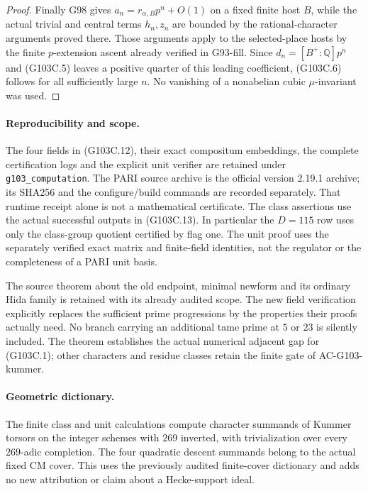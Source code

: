 \begin{proof}
Finally G98 gives $a_n=r_{\alpha,B}p^n+O(1)$ on a fixed finite
host $B$, while the actual trivial and central terms $h_n,z_n$
are bounded by the rational-character arguments proved there.
Those arguments apply to the selected-place hosts by the finite
$p$-extension ascent already verified in G93-fill.
Since $d_n=[B^+:\mathbb Q]p^n$ and (G103C.5) leaves a positive
quarter of this leading coefficient, (G103C.6) follows for all
sufficiently large $n$.
No vanishing of a nonabelian cubic $\mu$-invariant was used.
\end{proof}

\paragraph{Reproducibility and scope.}
The four fields in (G103C.12), their exact compositum embeddings,
the complete certification logs and the explicit unit verifier are
retained under \texttt{g103\_computation}.
The PARI source archive is the official version 2.19.1 archive;
its SHA256 and the configure/build commands are recorded separately.
That runtime receipt alone is not a mathematical certificate.
The class assertions use the actual successful outputs in
(G103C.13).  In particular the $D=115$ row uses only the
class-group quotient certified by flag one.
The unit proof uses the separately verified exact matrix and
finite-field identities, not the regulator or the completeness of
a PARI unit basis.

The source theorem about the old endpoint, minimal newform and its
ordinary Hida family is retained with its already audited scope.
The new field verification explicitly replaces the sufficient
prime progressions by the properties their proofs actually need.
No branch carrying an additional tame prime at $5$ or $23$ is
silently included.  The theorem establishes the actual numerical
adjacent gap for (G103C.1); other characters and residue classes
retain the finite gate of AC-G103-kummer.

\paragraph{Geometric dictionary.}
The finite class and unit calculations compute character summands
of Kummer torsors on the integer schemes with $269$ inverted, with
trivialization over every $269$-adic completion.
The four quadratic descent summands belong to the actual fixed
CM cover.  This uses the previously audited finite-cover dictionary
and adds no new attribution or claim about a Hecke-support ideal.
